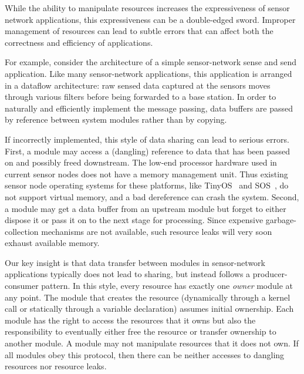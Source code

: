 While the ability to manipulate resources increases the expressiveness
of sensor network applications, this expressiveness can be a
double-edged sword.  Improper management of resources can lead to
subtle errors that can affect both the correctness and efficiency of
applications.

For example, consider the architecture of a simple sensor-network
sense and send application.
Like many sensor-network applications, this application is
arranged in a dataflow architecture:  raw sensed data captured at the
sensors moves through various filters
before being forwarded to a base station.
In order to naturally and efficiently implement the message passing,
data buffers are %
passed by
reference between system modules rather than by copying.

If incorrectly implemented, this style of data sharing can lead to
serious errors.  First, a module may access a (dangling) reference to
data that has been passed on and possibly freed downstream. 
%
The low-end processor hardware used in current sensor nodes does not
have a memory management unit.  Thus existing sensor node operating
systems for these platforms, like TinyOS~\cite{TinyOS} and
SOS~\cite{sos}, do not support virtual memory, and a bad dereference
can crash the system. 
%
Second, a module may get a data buffer from an upstream module but
forget to either dispose it or pass it on to the next stage for
processing.  Since expensive garbage-collection mechanisms are not
available, such resource leaks will very soon exhaust available
memory.


Our key insight is that data transfer between
modules in sensor-network applications 
typically does not lead to sharing, but instead follows a
producer-consumer pattern.  %
In this style,
every resource has exactly one {\em owner} module at any point.  The
module that creates the resource (dynamically 
through a kernel call or statically
through a variable declaration) assumes initial ownership.
Each module has the right to access the resources that it owns but
also the responsibility to eventually either free the resource or transfer
ownership to another module.  
%
A module may not manipulate resources that it does not own.  If all
modules obey this protocol, then there can be neither accesses to
dangling resources nor resource leaks.



